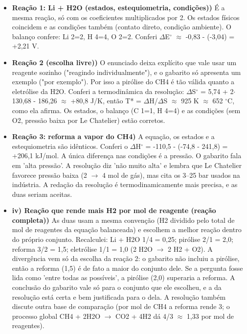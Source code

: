 \documentclass{article}%
\begin{document}
\begin{itemize}%
\item%
\textbf{Reação 1: Li + H2O (estados, estequiometria, condições))} É a mesma reação, só com os coeficientes multiplicados por 2. Os estados físicos coincidem e as condições também (contato direto, condição ambiente). O balanço confere: Li 2=2, H 4=4, O 2=2. Conferi $\Delta$E$^\circ$ $\approx$ -0,83 - (-3,04) = +2,21 V.%
\item%
\textbf{Reação 2 (escolha livre))} O enunciado deixa explícito que vale usar um reagente sozinho ("reagindo individualmente"), e o gabarito só apresenta um exemplo ("por exemplo"). Por isso a pirólise do CH4 é tão válida quanto a eletrólise da H2O. Conferi a termodinâmica da resolução: $\Delta$S$^\circ$ = 5,74 + 2$\cdot$130,68 - 186,26 $\approx$ +80,8 J/K, então T* = $\Delta$H/$\Delta$S $\approx$ 925 K $\approx$ 652 $^\circ$C, como ela afirma. Os estados, o balanço (C 1=1, H 4=4) e as condições (sem O2, pressão baixa por Le Chatelier) estão corretos.%
\item%
\textbf{Reação 3: reforma a vapor do CH4)} A equação, os estados e a estequiometria são idênticos. Conferi o $\Delta$H$^\circ$ = -110,5 - (-74,8 - 241,8) = +206,1 kJ/mol. A única diferença nas condições é a pressão. O gabarito fala em 'alta pressão'. A resolução diz 'não muito alta' e lembra que Le Chatelier favorece pressão baixa (2 $\to$ 4 mol de gás), mas cita os 3--25 bar usados na indústria. A redação da resolução é termodinamicamente mais precisa, e as duas seriam aceitas.%
\item%
\textbf{iv) Reação que rende mais H2 por mol de reagente (reação completa))} As duas usam a mesma convenção (H2 dividido pelo total de mol de reagentes da equação balanceada) e escolhem a melhor reação dentro do próprio conjunto. Recalculei: Li + H2O 1/4 = 0,25; pirólise 2/1 = 2,0; reforma 3/2 = 1,5; eletrólise 1/1 = 1,0 (2 H2O $\to$ 2 H2 + O2). A divergência vem só da escolha da reação 2: o gabarito não incluiu a pirólise, então a reforma (1,5) é de fato a maior do conjunto dele. Se a pergunta fosse lida como 'entre todas as possíveis', a pirólise (2,0) superaria a reforma. A conclusão do gabarito vale só para o conjunto que ele escolheu, e a da resolução está certa e bem justificada para o dela. A resolução também discute outra base de comparação (por mol de CH4 a reforma rende 3; o processo global CH4 + 2H2O $\to$ CO2 + 4H2 dá 4/3 $\approx$ 1,33 por mol de reagentes).%
\end{itemize}%
\end{document}
